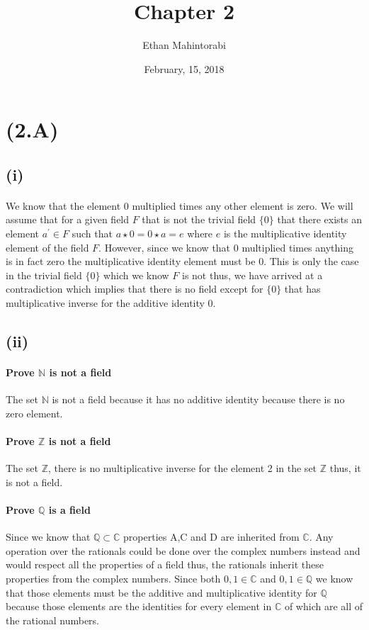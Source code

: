 \documentclass{article}
\begin{document}
  
  \title{Chapter 2}
  \author{Ethan Mahintorabi}
  \date{February, 15, 2018}
  
  \maketitle
  \section*{(2.A)}
    \subsection*{(i)}
      \paragraph{}
        We know that the element 0 multiplied times any other element is zero. We will assume that for a given field $F$ that is not the trivial field $\{0\}$ that there exists an element $a^{\prime} \in F$ such that $a \star 0 = 0 \star a = e$ where $e$ is the multiplicative identity element of the field $F$. However, since we know that 0 multiplied times anything is in fact zero the multiplicative identity element must be 0. This is only the case in the trivial field $\{0\}$ which we know $F$ is not thus, we have arrived at a contradiction which implies that there is no field except for $\{0\}$ that has multiplicative inverse for the additive identity 0.
    
    \subsection*{(ii)}
      \paragraph{Prove $\mathbb{N}$ is not a field}
      The set $\mathbb{N}$ is not a field because it has no additive identity because there is no zero element.

      \paragraph{Prove $\mathbb{Z}$ is not a field}
      The set $\mathbb{Z}$, there is no multiplicative inverse for the element 2 in the set $\mathbb{Z}$ thus, it is not a field.

      \paragraph{Prove $\mathbb{Q}$ is a field}
      Since we know that $\mathbb{Q} \subset \mathbb{C}$ properties A,C and D are inherited from $\mathbb{C}$. Any operation over the rationals could be done over the complex numbers instead and would respect all the properties of a field thus, the rationals inherit these properties from the complex numbers. Since both $0,1 \in \mathbb{C}$ and $0,1 \in \mathbb{Q}$ we know that those elements must be the additive and multiplicative identity for $\mathbb{Q}$ because those elements are the identities for every element in $\mathbb{C}$ of which are all of the rational numbers. 
\end{document}
